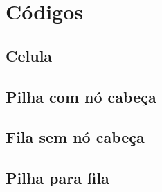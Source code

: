 \documentclass{article}
\begin{document}
\section{Códigos}
\subsection{Celula}

\newpage

\subsection{Pilha com nó cabeça}


\vspace{1cm}


\subsection{Fila sem nó cabeça}


\vspace{1cm}
\subsection{Pilha para fila}

\end{document}
